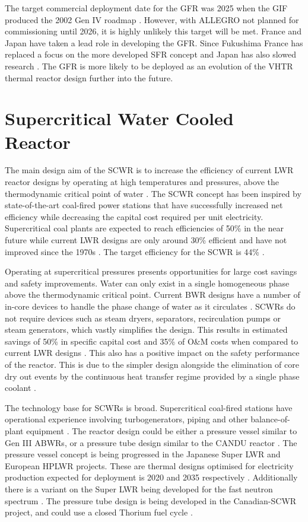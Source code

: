 \documentclass[journal]{IEEEtran}
\begin{document}
The target commercial deployment date for the GFR was 2025 when the GIF produced the 2002 Gen IV roadmap \cite{GenIVRoadmap}. 
However, with ALLEGRO not planned for commissioning until 2026, it is highly unlikely this target will be met.
France and Japan have taken a lead role in developing the GFR.
Since Fukushima France has replaced a focus on the more developed SFR concept and Japan has also slowed research \cite{GenIVForum}.
The GFR is more likely to be deployed as an evolution of the VHTR thermal reactor design further into the future.

\section{Supercritical Water Cooled Reactor}
The main design aim of the SCWR is to increase the efficiency of current LWR reactor designs by operating at high temperatures and pressures, above the thermodynamic critical point of water \cite{GenIVRoadmap}.
The SCWR concept has been inspired by state-of-the-art coal-fired power stations that have successfully increased net efficiency while decreasing the capital cost required per unit electricity.
Supercritical coal plants are expected to reach efficiencies of 50\% in the near future while current LWR designs are only around 30\% efficient and have not improved since the 1970s \cite{GenIVForum}.
The target efficiency for the SCWR is 44\% \cite{Marques2010a}.

Operating at supercritical pressures presents opportunities for large cost savings and safety improvements. 
Water can only exist in a single homogeneous phase above the thermodynamic critical point.
Current BWR designs have a number of in-core devices to handle the phase change of water as it circulates \cite{Marques2010a}.
SCWRs do not require devices such as steam dryers, separators, recirculation pumps or steam generators, which vastly simplifies the design.
This results in estimated savings of 50\% in specific capital cost and 35\% of O\&M costs when compared to current LWR designs \cite{GenIVRoadmap}.
This also has a positive impact on the safety performance of the reactor.
This is due to the simpler design alongside the elimination of core dry out events by the continuous heat transfer regime provided by a single phase coolant \cite{GenIVRoadmap}.

The technology base for SCWRs is broad. Supercritical coal-fired stations have operational experience involving turbogenerators, piping and other balance-of-plant equipment \cite{GenIVRoadmap}.
The reactor design could be either a pressure vessel similar to Gen III ABWRs, or a pressure tube design similar to the CANDU reactor \cite{Bhatnagar2011}.
The pressure vessel concept is being progressed in the Japanese Super LWR and European HPLWR projects. 
These are thermal designs optimised for electricity production expected for deployment is 2020 and 2035 respectively \cite{Locatelli2013}.
Additionally there is a variant on the Super LWR being developed for the fast neutron spectrum \cite{Locatelli2013}.
The pressure tube design is being developed in the Canadian-SCWR project, and could use a closed Thorium fuel cycle \cite{Locatelli2013}.
\end{document}
